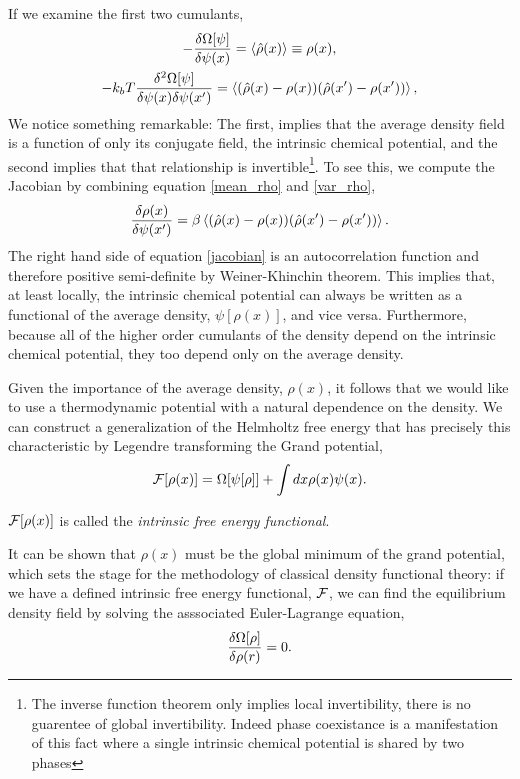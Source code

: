 If we examine the first two cumulants,
%
\begin{gather}
    \label{mean_rho}
    - \frac{\delta \Omega[\psi]}{\delta \psi(x)}
        = \left\langle \hat{\rho}(x) \right\rangle \equiv \rho(x), \\
    \label{var_rho} 
    -k_b T\frac{\delta^2 \Omega[\psi]}{\delta \psi(x) \delta \psi(x^\prime)}
        = \left\langle (\hat{\rho}(x) - \rho(x))
          (\hat{\rho}(x^\prime) - \rho(x^\prime)) \right\rangle,
\end{gather}
%
We notice something remarkable: The first, implies that the average density field is a function of only its conjugate
field, the intrinsic chemical potential, and the second implies that that
relationship is invertible\footnote{The inverse function theorem only implies
local invertibility, there is no guarentee of global invertibility. Indeed
phase coexistance is a manifestation of this fact where a single intrinsic
chemical potential is shared by two phases}.  To see this, we compute the 
Jacobian by combining equation \ref{mean_rho} and \ref{var_rho},
%
\begin{equation}
    \label{jacobian}
    \frac{\delta \rho(x)}{\delta \psi(x^\prime)} 
        = \beta \left\langle (\hat{\rho}(x) - \rho(x))
        (\hat{\rho}(x^\prime) - \rho(x^\prime)) \right\rangle.
\end{equation}
%
The right hand side of equation \ref{jacobian} is an autocorrelation function
and therefore positive semi-definite by Weiner-Khinchin theorem. This implies
that, at least locally, the intrinsic chemical potential can always be written
as a functional of the average density, $\psi[\rho(x)]$, and vice versa.
Furthermore, because all of the higher order cumulants of the density depend on
the intrinsic chemical potential, they too depend only on the average density.

Given the importance of the average density, $\rho(x)$, it follows that we would
like to use a thermodynamic potential with a natural dependence on the density.
We can construct a generalization of the Helmholtz free energy that has
precisely this characteristic by Legendre transforming the Grand potential,
%
\begin{equation}
    \mathcal{F}[\rho(x)] = \Omega[\psi[\rho]] + \int dx \rho(x) \psi(x).
\end{equation}
%

$\mathcal{F}[\rho(x)]$ is called the \textit{intrinsic free energy functional}.

It can be shown \cite{HansenAppendixB} that $\rho(x)$ must be the global minimum
of the grand potential, which sets the stage for the methodology of classical
density functional theory: if we have a defined intrinsic free energy
functional, $\mathcal{F}$, we can find the equilibrium density field by solving the
asssociated Euler-Lagrange equation, 
%
\begin{equation}
    \frac{\delta \Omega[\rho]}{\delta \rho(r)} = 0.
\end{equation}
%

